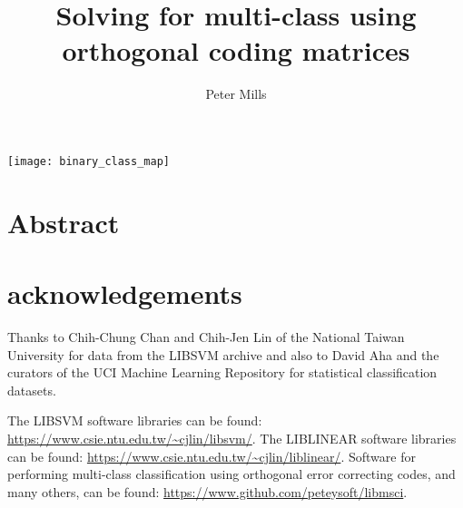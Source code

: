 \documentclass{article}
\begin{document}
\title{Solving for multi-class using orthogonal coding matrices}

\author{Peter Mills}

\maketitle

\begin{center}
  \texttt{[image: binary\_class\_map]}
\end{center}

\section*{Abstract}

	



\appendix

\section*{acknowledgements}
Thanks to Chih-Chung Chan and Chih-Jen Lin of the National Taiwan University
for data from the LIBSVM archive and also to David Aha and the curators of
the UCI Machine Learning Repository for statistical classification datasets.

	The LIBSVM software libraries can be found: \url{https://www.csie.ntu.edu.tw/~cjlin/libsvm/}.
	The LIBLINEAR software libraries can be found: \url{https://www.csie.ntu.edu.tw/~cjlin/liblinear/}.
	Software for performing multi-class classification using orthogonal error correcting codes, and many others, can be found: \url{https://www.github.com/peteysoft/libmsci}.


%


\end{document}
